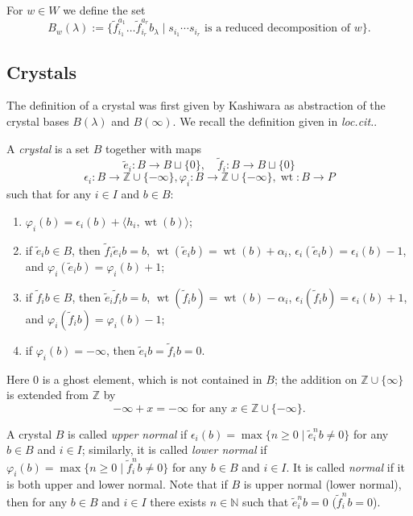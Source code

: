 \documentclass[final]{amsart}
\theoremstyle{plain}
\theoremstyle{definition}
\newcommand{\bbN}{\mathbb N}
\newcommand{\bbZ}{\mathbb Z}
\newcommand{\te}{\tilde e}
\newcommand{\tf}{\tilde f}
\DeclareMathOperator{\weight}{wt}
\begin{document}
For $w\in W$ we define the set
\begin{equation}
    B_w(\lambda) := \{ \tf_{i_1}^{a_1} \dots \tf_{i_r}^{a_r} b_\lambda \mid s_{i_1}\cdots s_{i_r} \text{ is a reduced decomposition of } w \}.
\end{equation}

\subsection{Crystals}

The definition of a crystal was first given by Kashiwara \cite{Kashiwara:CrystalBase-Littelmann-DemazureCharacterFormula} as abstraction of the crystal bases $B(\lambda)$ and $B(\infty)$.
We recall the definition given in \emph{loc.cit.}.

A \emph{crystal} is a set $B$ together with maps
\[
    \te_i\colon B \to B \sqcup \{ 0 \},\quad \tf_i\colon B \to B \sqcup \{ 0 \}
\]
\[
    \epsilon_i\colon B \to \bbZ \cup \{ -\infty \}, \varphi_i\colon B \to \bbZ \cup \{ -\infty \}, \weight\colon B \to P
\]
such that for any $i\in I$ and $b \in B$:
\begin{enumerate}
    \item $\varphi_i(b) = \epsilon_i(b) + \langle h_i, \weight(b)\rangle$;
    \item if $\te_i b\in B$, then $\tf_i \te_i b = b$, $\weight(\te_i b) = \weight(b) + \alpha_i$, $\epsilon_i(\te_i b) = \epsilon_i(b) - 1$, and $\varphi_i(\te_i b) = \varphi_i(b) + 1$;
    \item if $\tf_i b\in B$, then $\te_i \tf_i b = b$, $\weight(\tf_i b) = \weight(b) - \alpha_i$, $\epsilon_i(\tf_i b) = \epsilon_i(b) + 1$, and $\varphi_i(\tf_i b) = \varphi_i(b) - 1$;
    \item if $\varphi_i(b) = -\infty$, then $\te_i b = \tf_i b = 0$.
\end{enumerate}
Here $0$ is a ghost element, which is not contained in $B$; the addition on $\bbZ \cup \{ \infty \}$ is extended from $\bbZ$ by
\[
    -\infty + x = -\infty \text{ for any } x \in \bbZ \cup \{ -\infty \}.
\]

A crystal $B$ is called \emph{upper normal} if $\epsilon_i(b) = \max\{ n \ge 0 \mid \te_i^n b \neq 0 \}$ for any $b\in B$ and $i\in I$; similarly, it is called \emph{lower normal} if $\varphi_i(b) = \max\{ n \ge 0 \mid \tf_i^n b \neq 0 \}$ for any $b\in B$ and $i\in I$.
It is called \emph{normal} if it is both upper and lower normal.
Note that if $B$ is upper normal (lower normal), then for any $b\in B$ and $i\in I$ there exists $n \in \bbN$ such that $\te_i^n b = 0$ ($\tf_i^n b = 0$).
\end{document}
